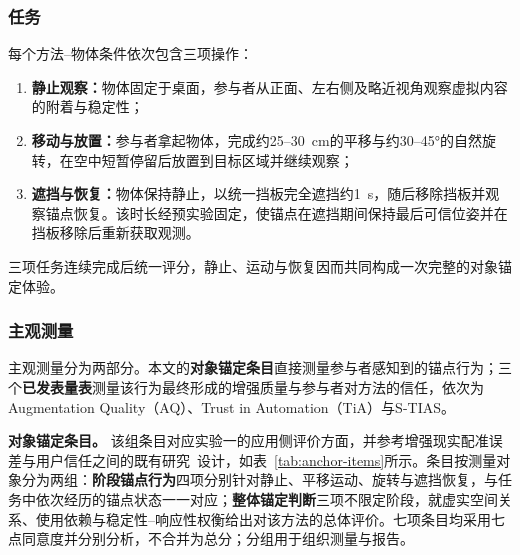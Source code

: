 \documentclass[review]{vgtc}
\begin{document}
\subsubsection{任务}

每个方法--物体条件依次包含三项操作：
\begin{enumerate}[leftmargin=1.8em,label=(\arabic*),itemsep=1pt,topsep=2pt]
  \item \textbf{静止观察：}物体固定于桌面，参与者从正面、左右侧及略近视角观察虚拟内容的附着与稳定性；
  \item \textbf{移动与放置：}参与者拿起物体，完成约25--30~cm的平移与约30--45°的自然旋转，在空中短暂停留后放置到目标区域并继续观察；
  \item \textbf{遮挡与恢复：}物体保持静止，以统一挡板完全遮挡约1~s，随后移除挡板并观察锚点恢复。该时长经预实验固定，使锚点在遮挡期间保持最后可信位姿并在挡板移除后重新获取观测。
\end{enumerate}

三项任务连续完成后统一评分，静止、运动与恢复因而共同构成一次完整的对象锚定体验。

\subsubsection{主观测量}

主观测量分为两部分。本文的\textbf{对象锚定条目}直接测量参与者感知到的锚点行为；三个\textbf{已发表量表}测量该行为最终形成的增强质量与参与者对方法的信任，依次为Augmentation Quality（AQ）、Trust in Automation（TiA）与S-TIAS。

\textbf{对象锚定条目。}
该组条目对应实验一的应用侧评价方面，并参考增强现实配准误差与用户信任之间的既有研究~\cite{gottsacker2024artrust}设计，如表~\ref{tab:anchor-items}所示。条目按测量对象分为两组：\textbf{阶段锚点行为}四项分别针对静止、平移运动、旋转与遮挡恢复，与任务中依次经历的锚点状态一一对应；\textbf{整体锚定判断}三项不限定阶段，就虚实空间关系、使用依赖与稳定性--响应性权衡给出对该方法的总体评价。七项条目均采用七点同意度并分别分析，不合并为总分；分组用于组织测量与报告。
\end{document}
